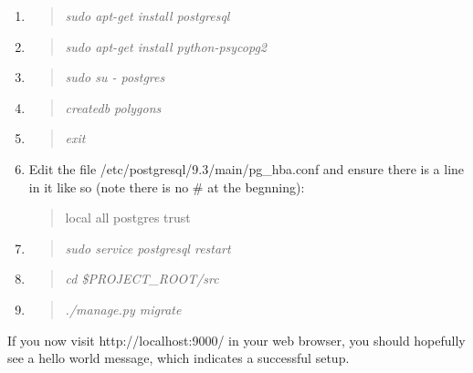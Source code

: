 \documentclass[12pt]{article}
\newenvironment{command}
   { 
      \begin{quote}\itshape
      \color{blue}
   }
   { \end{quote} }
\newenvironment{data}
   { 
      \begin{quote}\itshape
      \color{red}
   }
   { \end{quote} }
\begin{document}
\begin{enumerate}
   \item \begin{command} sudo apt-get install postgresql \end{command}
   \item \begin{command} sudo apt-get install python-psycopg2 \end{command}
   \item \begin{command} sudo su - postgres \end{command}
   \item \begin{command} createdb polygons \end{command}
   \item \begin{command} exit \end{command}
   \item Edit the file /etc/postgresql/9.3/main/pg\_hba.conf and ensure there is
         a line in it like so (note there is no \# at the begnning):
         \begin{data}
         local all postgres trust
         \end{data}
   \item \begin{command} sudo service postgresql restart \end{command}
   \item \begin{command} cd \$PROJECT\_ROOT/src \end{command}
   \item \begin{command} ./manage.py migrate \end{command}
\end{enumerate}

If you now visit http://localhost:9000/ in your web browser, you should
hopefully see a hello world message, which indicates a successful setup.
\end{document}
